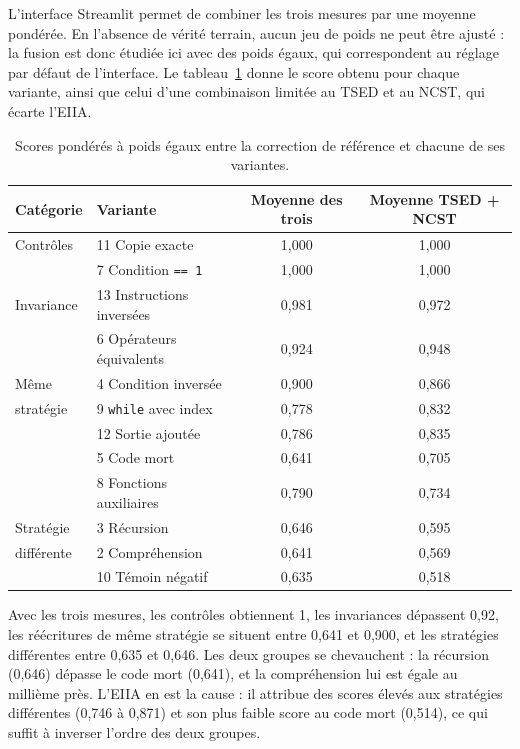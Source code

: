 \documentclass[12pt,a4paper,oneside]{report}
\begin{document}
L'interface Streamlit permet de combiner les trois mesures par une moyenne
pondérée. En l'absence de vérité terrain, aucun jeu de poids ne peut être
ajusté : la fusion est donc étudiée ici avec des poids égaux, qui
correspondent au réglage par défaut de l'interface. Le
tableau~\ref{tab:fusion_variantes} donne le score obtenu pour chaque
variante, ainsi que celui d'une combinaison limitée au TSED et au NCST, qui
écarte l'EIIA.

\begin{table}[htbp]
\centering
\small
\renewcommand{\arraystretch}{1.15}
\begin{tabular}{llcc}
\toprule
\textbf{Catégorie} & \textbf{Variante} &
\textbf{Moyenne des trois} & \textbf{Moyenne TSED + NCST} \\
\midrule
Contrôles  & 11 Copie exacte & 1,000 & 1,000 \\
           & 7 Condition \texttt{== 1} & 1,000 & 1,000 \\
\midrule
Invariance & 13 Instructions inversées & 0,981 & 0,972 \\
           & 6 Opérateurs équivalents & 0,924 & 0,948 \\
\midrule
Même       & 4 Condition inversée & 0,900 & 0,866 \\
stratégie  & 9 \texttt{while} avec index & 0,778 & 0,832 \\
           & 12 Sortie ajoutée & 0,786 & 0,835 \\
           & 5 Code mort & 0,641 & 0,705 \\
           & 8 Fonctions auxiliaires & 0,790 & 0,734 \\
\midrule
Stratégie  & 3 Récursion & 0,646 & 0,595 \\
différente & 2 Compréhension & 0,641 & 0,569 \\
           & 10 Témoin négatif & 0,635 & 0,518 \\
\bottomrule
\end{tabular}
\caption{Scores pondérés à poids égaux entre la correction de référence et
chacune de ses variantes.}
\label{tab:fusion_variantes}
\end{table}

Avec les trois mesures, les contrôles obtiennent 1, les invariances
dépassent 0,92, les réécritures de même stratégie se situent entre 0,641 et
0,900, et les stratégies différentes entre 0,635 et 0,646. Les deux groupes
se chevauchent : la récursion (0,646) dépasse le code mort (0,641), et la
compréhension lui est égale au millième près. L'EIIA en est la cause : il
attribue des scores élevés aux stratégies différentes (0,746 à 0,871) et son
plus faible score au code mort (0,514), ce qui suffit à inverser l'ordre des
deux groupes.
\end{document}
